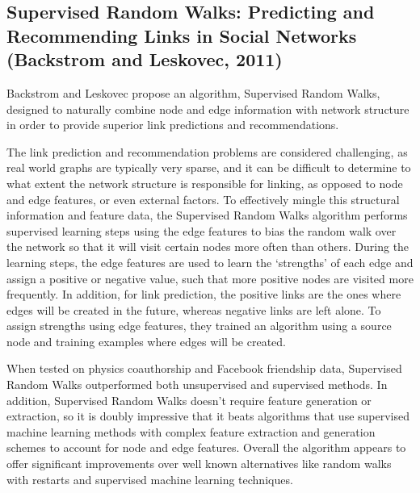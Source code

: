 \subsection{Supervised Random Walks: Predicting and Recommending Links in Social Networks (Backstrom and Leskovec, 2011)}

Backstrom and Leskovec propose an algorithm, Supervised Random Walks, designed
to naturally combine node and edge information with network structure in order
to provide superior link predictions and recommendations.

The link prediction and recommendation problems are considered challenging, as
real world graphs are typically very sparse, and it can be difficult to
determine to what extent the network structure is responsible for linking, as
opposed to node and edge features, or even external factors.  To effectively
mingle this structural information and feature data, the Supervised Random Walks
algorithm performs supervised learning steps using the edge features to bias the
random walk over the network so that it will  visit certain nodes more often
than others.  During the learning steps, the  edge features are used to learn
the `strengths' of each edge and assign a  positive or negative value, such that
more positive nodes are visited more  frequently.  In addition, for link
prediction, the positive links are the ones  where edges will be created in the
future, whereas negative links are left  alone.  To assign strengths using edge
features, they trained an algorithm  using a source node and training examples
where edges will be created.

When tested on physics coauthorship and Facebook friendship data, Supervised
Random Walks outperformed both unsupervised and supervised methods.  In
addition, Supervised Random Walks doesn't require feature generation or
extraction, so it is doubly impressive that it beats algorithms that use
supervised machine learning methods with complex feature extraction and
generation schemes to account for node and edge features. Overall the algorithm
appears to offer significant improvements over well known alternatives like
random walks with restarts and supervised machine learning techniques.

